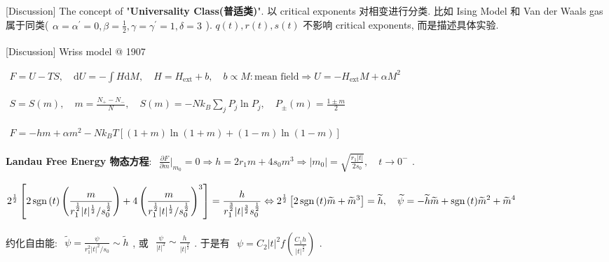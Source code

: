 \documentclass[../../main.tex]{subfiles}
\begin{document}
[Discussion] The concept of "\textbf{Universality Class(普适类)}". 以 critical exponents 对相变进行分类. 比如 Ising Model 和 Van der Waals gas 属于同类($\begin{aligned}
    \alpha=\alpha^{\prime} = 0, \beta = \frac{1}{2}, \gamma = \gamma^{\prime} = 1, \delta = 3
\end{aligned}$). $q(t),r(t),s(t)$ 不影响 critical exponents, 而是描述具体实验. 

[Discussion] Wriss model @ 1907

$\begin{aligned}
    F = U-TS,\quad \mathrm{d}U = -\int H\mathrm{d}M,\quad H = H_{\text{ext}}+b,\quad b\propto M:\text{mean field}\Rightarrow U = -H_{\text{ext}}M + \alpha M^{2}
\end{aligned}$

$\begin{aligned}
    S = S(m),\quad m = \frac{N_{+}-N_{-}}{N},\quad S(m) = -Nk_{B}\sum_{j}P_{j}\ln{P_{j}},\quad P_{\pm}(m) = \frac{1\pm m}{2}
\end{aligned}$

$\begin{aligned}
    F = -h m + \alpha m^{2} -Nk_{B}T [(1+m)\ln{(1+m)} + (1-m)\ln{(1-m)}]
\end{aligned}$

\textbf{Landau Free Energy 物态方程}:  $\begin{aligned}
    \frac{\partial F}{\partial m}\bigg|_{m_{0}} = 0\Rightarrow h = 2r_{1}m + 4s_{0}m^{3}\Rightarrow |m_{0}|= \sqrt{\frac{r_{1}|t|}{2s_{0}}},\quad t\rightarrow 0^{-}
\end{aligned}$. 

$\begin{aligned}
    2^{\frac{1}{2}}\left[
        2\operatorname{sgn}{(t)}\left(\frac{m}{r_{1}^{\frac{1}{2}}|t|^{\frac{1}{2}}/s_{0}^{\frac{1}{2}}}\right) + 4 \left(\frac{m}{r_{1}^{\frac{1}{2}}|t|^{\frac{1}{2}}/s_{0}^{\frac{1}{2}}}\right)^{3}
    \right] = \frac{h}{r_{1}^{\frac{3}{2}}|t|^{\frac{3}{2}}s_{0}^{\frac{1}{2}}} \Leftrightarrow 2^{\frac{1}{2}}\left[2\operatorname{sgn}{(t)}\widetilde{m}+\widetilde{m}^{3}\right] = \widetilde{h},\quad \widetilde{\psi} = -\widetilde{h} \widetilde{m} + \operatorname{sgn}{(t)}\widetilde{m}^{2} + \widetilde{m}^{4}
\end{aligned}$

约化自由能: $\begin{aligned}
    \widetilde{\psi} = \frac{\psi}{r_{1}^{2}|t|^{2}/s_{0}}\sim \widetilde{h}
\end{aligned}$, 或 $\begin{aligned}
    \frac{\psi}{|t|^{2}}\sim \frac{h}{|t|^{\frac{3}{2}}}
\end{aligned}$. 于是有 $\begin{aligned}
    \boxed{\psi = C_{2}|t|^{2}f\left(\frac{C_{1}h}{|t|^{\frac{3}{2}}}\right)}
\end{aligned}$. 
\end{document}

